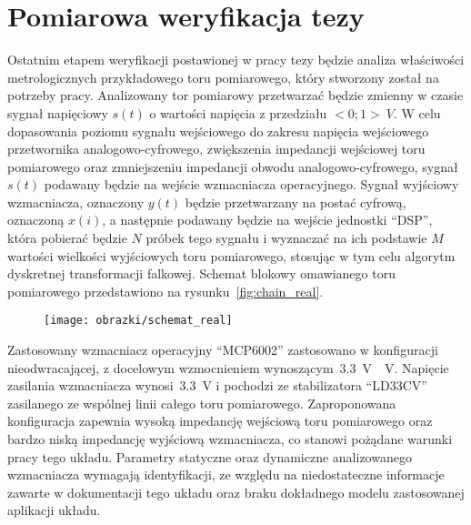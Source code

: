 \chapter{Pomiarowa weryfikacja tezy}

Ostatnim etapem weryfikacji postawionej w pracy tezy będzie analiza właściwości metrologicznych przykładowego toru pomiarowego, który stworzony został na potrzeby pracy. Analizowany tor pomiarowy przetwarzać będzie zmienny w czasie sygnał napięciowy $s(t)$ o wartości napięcia z przedziału $<0;1>~\unit{V}$. W celu dopasowania poziomu sygnału wejściowego do zakresu napięcia wejściowego przetwornika analogowo-cyfrowego, zwiększenia impedancji wejściowej toru pomiarowego oraz zmniejszeniu impedancji obwodu analogowo-cyfrowego, sygnał $s(t)$ podawany będzie na wejście wzmacniacza operacyjnego. Sygnał wyjściowy wzmacniacza, oznaczony $y(t)$ będzie przetwarzany na postać cyfrową, oznaczoną $x(i)$, a następnie podawany będzie na wejście jednostki \enquote{DSP}, która pobierać będzie $N$ próbek tego sygnału i wyznaczać na ich podstawie $M$ wartości wielkości wyjściowych toru pomiarowego, stosując w tym celu algorytm dyskretnej transformacji falkowej. Schemat blokowy omawianego toru pomiarowego przedstawiono na rysunku~\ref{fig:chain_real}.

\begin{figure}[htb!]
\begin{center}
\texttt{[image: obrazki/schemat\_real]}
\end{center}
\end{figure}

Zastosowany wzmacniacz operacyjny \enquote{MCP6002} zastosowano w konfiguracji nieodwracającej, z docelowym wzmocnieniem wynoszącym~\qty{3.3}{V \per V}. Napięcie zasilania wzmacniacza wynosi~\qty{3.3}{V} i pochodzi ze stabilizatora \enquote{LD33CV} zasilanego ze wspólnej linii całego toru pomiarowego. Zaproponowana konfiguracja zapewnia wysoką impedancję wejściową toru pomiarowego oraz bardzo niską impedancję wyjściową wzmacniacza, co stanowi pożądane warunki pracy tego układu. Parametry statyczne oraz dynamiczne analizowanego wzmacniacza wymagają identyfikacji, ze względu na niedostateczne informacje zawarte w dokumentacji tego układu oraz braku dokładnego modelu zastosowanej aplikacji układu.

